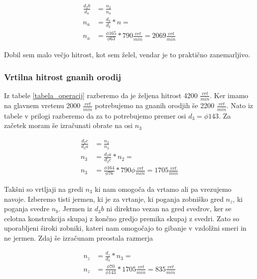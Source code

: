 \begin{equation}
	\label{eq:9}
	\begin{split}
		\frac{d_2b}{d_a} &= \frac{n_2}{n_a} \\
		n_a &= \frac{d_a}{d_2} * n = \\
		n_a &= \frac{\phi 165}{\phi 63} * 790 \frac{vrt}{min} = 2069 \frac{vrt}{min}
	\end{split}
\end{equation}

Dobil sem malo večjo hitrost, kot sem želel, vendar je to praktično zanemarljivo.

\subsubsection{Vrtilna hitrost gnanih orodij}
Iz tabele \ref{tabela_operacij} razberemo da je željena hitrost 4200 \(\frac{vrt}{min}\).
Ker imamo na glavnem vretenu 2000 \(\frac{vrt}{min}\) potrebujemo na gnanih orodjih
še 2200 \(\frac{vrt}{min}\). Nato iz tabele  v prilogi
razberemo da za to potrebujemo premer osi \(d_3 = \phi 143\). Za začetek moram
še izračunati obrate na osi \(n_3\)

\begin{equation}
	\label{eq:10}
	\begin{split}
		\frac{d_2c}{d_3a} &= \frac{n_2}{n_3} \\
		n_3 &= \frac{d_3a}{d_2c} * n_2 = \\
		n_3 &= \frac{\phi 164}{\phi 76} * 790 \phi \frac{vrt}{min} = 1705 \frac{vrt}{min}
	\end{split}
\end{equation}

Takšni so vrtljaji na gredi \(n_3\) ki nam omogoča da vrtamo ali pa vrezujemo navoje.
Izberemo tisti jermen, ki je za vrtanje, ki poganja zobniško gred \(n_z\), ki
poganja svedre \(n_b\). Jermen iz \(d_3b\) ni direktno vezan na gred svedrov,
ker se celotna konstrukcija skupaj z končno gredjo premika skupaj z
svedri. Zato so uporabljeni široki zobniki, kateri nam omogočajo to gibanje
v vzdolžni smeri in ne jermen. Zdaj še izračunam preostala razmerja

\begin{equation}
	\label{eq:11}
	\begin{split}
		n_z &= \frac{d_z}{d_3} * n_3 = \\
		n_z &= \frac{\phi 70}{\phi 143} * 1705 \frac{vrt}{min} = 835 \frac{vrt}{min}
	\end{split}
\end{equation}

